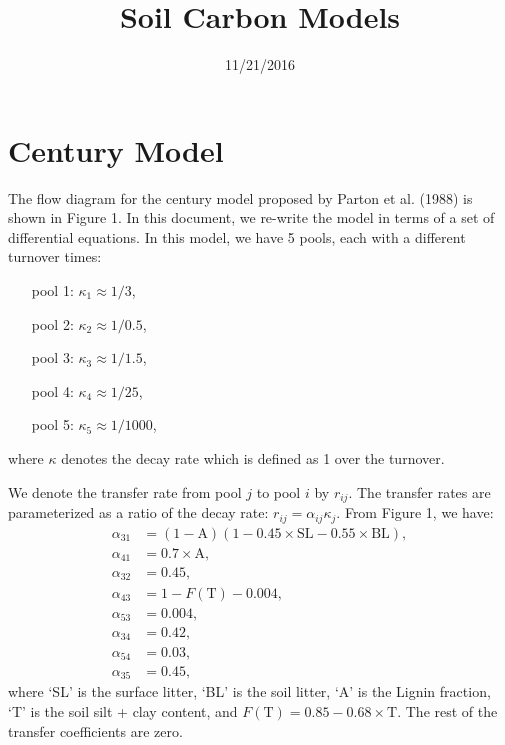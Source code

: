 \documentclass[10pt,a4paper]{article}
\title{Soil Carbon Models}
\date{11/21/2016}
\begin{document}
\maketitle
\section*{Century Model}
The flow diagram for the century model proposed by Parton et al. (1988) is shown in Figure 1. In this document, we re-write the model in terms of a set of differential equations. In this model, we have 5 pools, each with a different turnover times: 
\begin{itemize}
\item[pool 1:]   $\kappa_1 \approx 1/3$,
\item[pool 2:]  $\kappa_2 \approx 1/0.5$,
\item[pool 3:]   $\kappa_3 \approx 1/1.5$,
\item[pool 4:]  $\kappa_4 \approx 1/25$,
\item[pool 5:]   $\kappa_5 \approx 1/1000$,
\end{itemize}
where $\kappa$ denotes the decay rate which is defined as 1 over the turnover. 

We denote the transfer rate from pool $j$ to pool $i$ by $r_{ij}$. The transfer rates are parameterized as a ratio of the decay rate: $r_{ij} = \alpha_{ij} \kappa_j$. From Figure 1, we have:
\begin{align*}
\alpha_{31} & =  (1-\text{A})(1-0.45 \times \text{SL} - 0.55 \times \text{BL}), \\
\alpha_{41} & =  0.7 \times \text{A}, \\
\alpha_{32} & = 0.45, \\
\alpha_{43} & = 1 - F(\text{T}) - 0.004, \\
\alpha_{53} & = 0.004, \\
\alpha_{34} & = 0.42, \\
\alpha_{54} & = 0.03, \\
\alpha_{35} & = 0.45,
\end{align*}
where `SL' is the surface litter, `BL' is the soil litter, `A' is the Lignin fraction, `T' is the soil silt + clay content, and $F(\text{T}) = 0.85 - 0.68 \times \text{T}$. The rest of the transfer coefficients are zero. 
\end{document}
